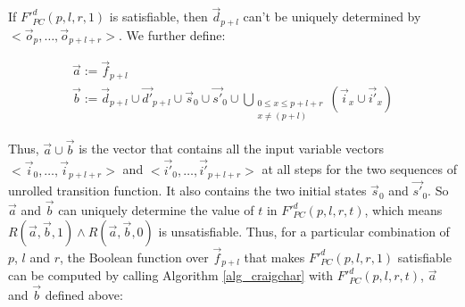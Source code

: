\documentclass[conference]{IEEEtran}
\begin{document}
If $F'^d_{PC}(p,l,r,1)$ is satisfiable,
then $\vec{d}_{p+l}$ can't be uniquely determined by $<\vec{o}_p,\dots,\vec{o}_{p+l+r}>$.
We further define:

% 


\begin{multline}\label{pcdef1}
\vec{a}:=\vec{f}_{p+l}\\
\vec{b}:=\vec{d}_{p+l}\cup \vec{d'}_{p+l}\cup \vec{s}_0\cup \vec{s'}_0\cup\bigcup_{\begin{array}{c}0\le x\le p+l+r\\x\neq (p+l)\end{array}}(\vec{i}_{x}\cup\vec{i'}_{x})
\end{multline}

Thus,
$\vec{a}\cup\vec{b}$ is the vector that contains all the input variable vectors $<\vec{i}_0,\dots,\vec{i}_{p+l+r}>$ and $<\vec{i'}_0,\dots,\vec{i'}_{p+l+r}>$
at all steps for the two sequences of unrolled transition function.
It also contains the two initial states $\vec{s}_0$ and $\vec{s'}_0$.
So $\vec{a}$ and $\vec{b}$ can uniquely determine the value of $t$ in $F'^d_{PC}(p,l,r,t)$,
which means $R(\vec{a},\vec{b},1)\wedge R(\vec{a},\vec{b},0)$ is unsatisfiable.
Thus,
for a particular combination of $p$, $l$ and $r$,
the Boolean function over $\vec{f}_{p+l}$ that makes $F'^d_{PC}(p,l,r,1)$ satisfiable can be computed 
by calling Algorithm \ref{alg_craigchar} with $F'^d_{PC}(p,l,r,t)$, $\vec{a}$ and $\vec{b}$ defined above:
\end{document}
